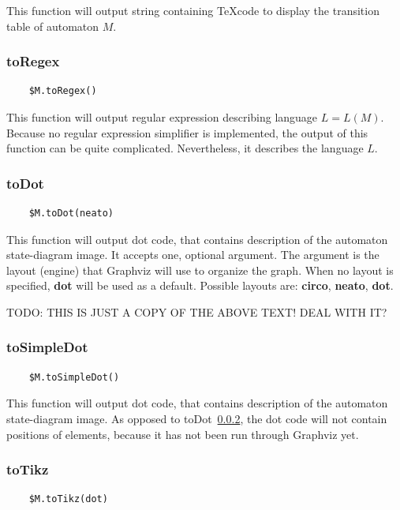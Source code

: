 \documentclass{ctuthesis}
\begin{document}
This function will output string containing \TeX code to display the transition table of automaton $M$. 

\subsubsection{toRegex}
\begin{verbatim}
	$M.toRegex()
\end{verbatim}

This function will output regular expression describing language $L = L(M)$. Because no regular expression simplifier is implemented, the output of this function can be quite complicated. Nevertheless, it describes the language $L$.

\subsubsection{toDot}
\label{subsec:toDot}
\begin{verbatim}
	$M.toDot(neato)
\end{verbatim}

This function will output dot code, that contains description of the automaton state-diagram image. It accepts one, optional argument. The argument is the layout (engine) that Graphviz will use to organize the graph. When no layout is specified, \textbf{dot} will be used as a default. Possible layouts are: \textbf{circo}, \textbf{neato}, \textbf{dot}. 

TODO: THIS IS JUST A COPY OF THE ABOVE TEXT! DEAL WITH IT?

\subsubsection{toSimpleDot}
\begin{verbatim}
	$M.toSimpleDot()
\end{verbatim}

This function will output dot code, that contains description of the automaton state-diagram image. As opposed to toDot~\ref{subsec:toDot}, the dot code will not contain positions of elements, because it has not been run through Graphviz yet. 

\subsubsection{toTikz}
\begin{verbatim}
	$M.toTikz(dot)
\end{verbatim}
\end{document}
